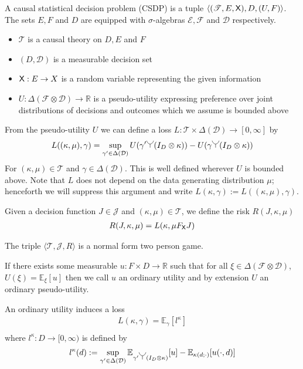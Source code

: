 \begin{definition}\label{def:CSDP}
A causal statistical decision problem (CSDP) is a tuple $\langle (\mathscr{T}, E, \mathsf{X}), D, (U,F) \rangle$. The sets $E,F$ and $D$ are equipped with $\sigma$-algebras $\mathcal{E},\mathcal{F}$ and $\mathcal{D}$ respectively.

\begin{itemize}
    \item $\mathscr{T}$ is a causal theory on $D, E$ and $F$
    \item $(D,\mathcal{D})$ is a measurable decision set
    \item $\mathsf{X}:E\to X$ is a random variable representing the given information
    \item $U:\Delta(\mathcal{F}\otimes \mathcal{D})\to \mathbb{R}$ is a pseudo-utility expressing preference over joint distributions of decisions and outcomes which we assume is bounded above
\end{itemize}

From the pseudo-utility $U$ we can define a loss $L:\mathscr{T}\times\Delta(\mathcal{D})\to [0,\infty]$ by
\begin{align}
    L((\kappa,\mu),\gamma) = \sup_{\gamma'\in\Delta(\mathcal{D})} U(\gamma'\splitter{0.15}(I_D\otimes \kappa)) - U(\gamma\splitter{0.15}(I_D\otimes \kappa))\label{eq:canonical_loss}
\end{align}
For $(\kappa,\mu)\in \mathscr{T}$ and $\gamma\in \Delta(\mathcal{D})$. This is well defined wherever $U$ is bounded above. Note that $L$ does not depend on the data generating distribution $\mu$; henceforth we will suppress this argument and write $L(\kappa,\gamma):= L((\kappa,\mu),\gamma)$.

Given a decision function $J\in\mathscr{J}$ and $(\kappa,\mu)\in \mathscr{T}$, we define the risk $R(J,\kappa,\mu)$
\begin{align}
    R(J,\kappa,\mu) = L(\kappa,\mu F_{\mathsf{X}} J)
\end{align}

The triple $\langle \mathscr{T}, \mathscr{J}, R\rangle$ is a normal form two person game.

If there exists some measurable $u:F\times D\to \mathbb{R}$ such that for all $\xi\in \Delta(\mathcal{F}\otimes\mathcal{D})$, $U(\xi)=\mathbb{E}_{\xi}[u]$ then we call $u$ an ordinary utility and by extension $U$ an ordinary pseudo-utility.

An ordinary utility induces a loss
\begin{align}
    L(\kappa,\gamma) = \mathbb{E}_{\gamma}[l^\kappa]\\
\end{align}
where $l^\kappa:D\to [0,\infty)$ is defined by
\begin{align}
    l^\kappa(d) := \sup_{\gamma'\in \Delta(\mathcal{D})} \mathbb{E}_{\gamma'\splitter{0.15}(I_D\otimes \kappa)}[u] - \mathbb{E}_{\kappa(d;\cdot)}[u(\cdot,d)]\label{eq:induced_l}
\end{align}
\end{definition}

